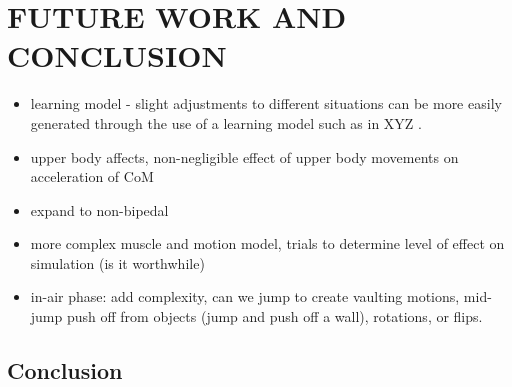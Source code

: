 
 
\chapter{FUTURE WORK AND CONCLUSION}
\label{chapter:future_work}

\begin{itemize}
	\item learning model - slight adjustments to different situations can be more easily generated through the use of a learning model such as in XYZ \cite{falling_landing, muscle_based_bipeds}.
	\item upper body affects, non-negligible effect of upper body movements on acceleration of CoM
	\item expand to non-bipedal
	\item more complex muscle and motion model, trials to determine level of effect on simulation (is it worthwhile)
	\item in-air phase: add complexity, can we jump to create vaulting motions, mid-jump push off from objects (jump and push off a wall), rotations, or flips.
\end{itemize}


\section{Conclusion}
\label{section:conclusion}